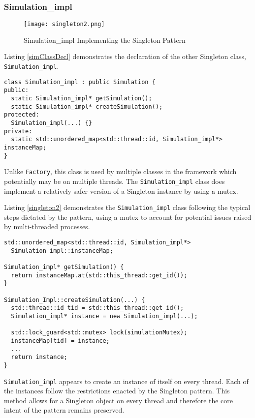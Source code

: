 \subsubsection{Simulation\_impl}

\begin{figure}[ht]
    \caption{Simulation\_impl Implementing the Singleton Pattern}
    \centering
    \texttt{[image: singleton2.png]}
\end{figure}

Listing \ref{simClassDecl} demonstrates the declaration of the other Singleton class, \texttt{Simulation\_impl}.

\begin{lstlisting}[style=customC++,label=simClassDecl,caption=Excerpt of Simulation\_impl Interface \\ File: src/sst/core/Simulation\_impl.h]
class Simulation_impl : public Simulation {
public:
  static Simulation_impl* getSimulation();
  static Simulation_impl* createSimulation();
protected:
  Simulation_impl(...) {}
private:
  static std::unordered_map<std::thread::id, Simulation_impl*> instanceMap;
}
\end{lstlisting}

Unlike \texttt{Factory}, this class is used by multiple classes in the framework which potentially may be on multiple threads. The \texttt{Simulation\_impl} class does implement a relatively safer version of a Singleton instance by using a mutex.

Listing \ref{singleton2} demonstrates the \texttt{Simulation\_impl} class following the typical steps dictated by the pattern, using a mutex to account for potential issues raised by multi-threaded processes.

\begin{lstlisting}[style=customC++,label=singleton2,caption=Simulation\_impl Implementing the Singleton Pattern \\ File: src/sst/core/simulation\_impl.cc]
std::unordered_map<std::thread::id, Simulation_impl*>
  Simulation_impl::instanceMap;

Simulation_impl* getSimulation() {
  return instanceMap.at(std::this_thread::get_id());
}

Simulation_Impl::createSimulation(...) {
  std::thread::id tid = std::this_thread::get_id();
  Simulation_impl* instance = new Simulation_impl(...);

  std::lock_guard<std::mutex> lock(simulationMutex);
  instanceMap[tid] = instance;
  ...
  return instance;
}
\end{lstlisting}

\texttt{Simulation\_impl} appears to create an instance of itself on every thread. Each of the instances follow the restrictions enacted by the Singleton pattern. This method allows for a Singleton object on every thread and therefore the core intent of the pattern remains preserved.
